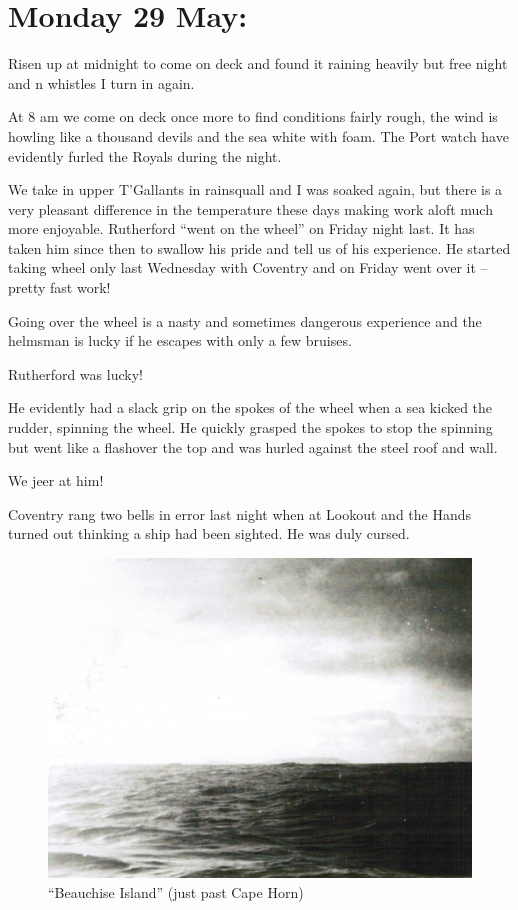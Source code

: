 \documentclass[
  11pt,
  msmallroyalvopaper
]{memoir}
\begin{document}
\hypertarget{monday-29-may}{%
\section{Monday 29 May:}\label{monday-29-may}}

Risen up at midnight to come on deck and found it raining heavily but
free night and n whistles I turn in again.

At 8 am we come on deck once more to find conditions fairly rough, the
wind is howling like a thousand devils and the sea white with foam. The
Port watch have evidently furled the Royals during the night.

We take in upper T'Gallants in rainsquall and I was soaked again, but
there is a very pleasant difference in the temperature these days making
work aloft much more enjoyable. Rutherford ``went on the wheel'' on
Friday night last. It has taken him since then to swallow his pride and
tell us of his experience. He started taking wheel only last Wednesday
with Coventry and on Friday went over it -- pretty fast work!

Going over the wheel is a nasty and sometimes dangerous experience and
the helmsman is lucky if he escapes with only a few bruises.

Rutherford was lucky!

He evidently had a slack grip on the spokes of the wheel when a sea
kicked the rudder, spinning the wheel. He quickly grasped the spokes to
stop the spinning but went like a flashover the top and was hurled
against the steel roof and wall.

We jeer at him!

Coventry rang two bells in error last night when at Lookout and the
Hands turned out thinking a ship had been sighted. He was duly cursed.

\begin{figure}
\centering
\includegraphics{./images/image015.png}
\caption{``Beauchise Island'' (just past Cape Horn)}
\end{figure}
\end{document}
